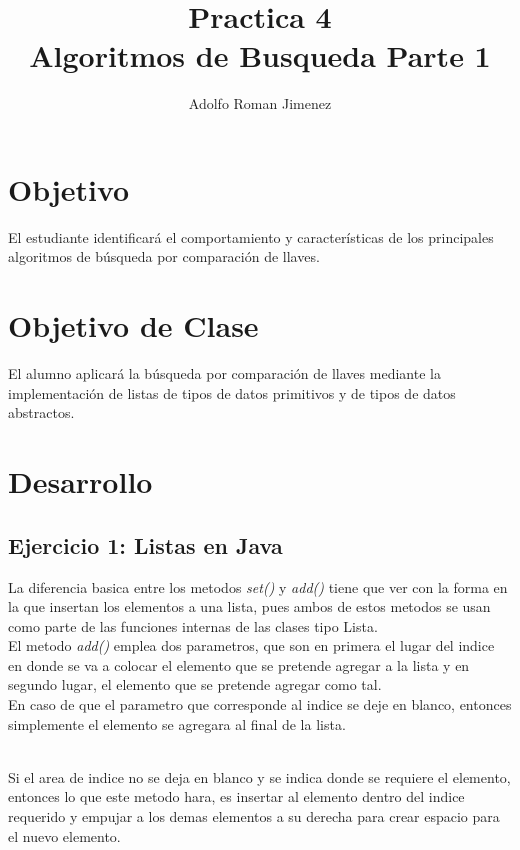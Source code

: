 \documentclass{article}
\title
{
	Practica 4 \\
	Algoritmos de Busqueda Parte 1
}
\author
{
	Adolfo Roman Jimenez
}
\begin{document}
	
	
	
	\maketitle
	
	\section{Objetivo}
		
		El estudiante identificará el comportamiento y características de los principales	algoritmos de búsqueda por comparación de llaves.
		
	\section{Objetivo de Clase}
		
		El alumno aplicará la búsqueda por comparación de llaves mediante la
		implementación de listas de tipos de datos primitivos y de tipos de datos abstractos.
		
	\newpage
		
	\section{Desarrollo}
	
		\subsection{Ejercicio 1: Listas en Java}
			
			La diferencia basica entre los metodos \emph{set()} y \emph{add()} tiene que ver con la forma en la que insertan los elementos a una lista, pues ambos de estos metodos se usan como parte de las funciones internas de las clases tipo Lista.\\
			
			El metodo \emph{add()} emplea dos parametros, que son en primera el lugar del indice en donde se va a colocar el elemento que se pretende agregar a la lista y en segundo lugar, el elemento que se pretende agregar como tal.\\
			
			En caso de que el parametro que corresponde al indice se deje en blanco, entonces simplemente el elemento se agregara al final de la lista.\\\
			
			Si el area de indice no se deja en blanco y se indica donde se requiere el elemento, entonces lo que este metodo hara, es insertar al elemento dentro del indice requerido y empujar a los demas elementos a su derecha para crear espacio para el nuevo elemento.\\
			
\end{document}
